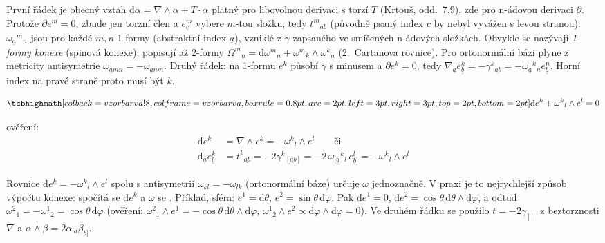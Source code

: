 \begin{vysvetleni}
První řádek je obecný vztah $\mathrm{d}\alpha=\nabla\wedge\alpha+T\cdot\alpha$ platný pro libovolnou derivaci s torzí $T$ (Krtouš, odd.~7.9), zde pro n-ádovou derivaci $\partial$. Protože $\partial e^m=0$, zbude jen torzní člen a $e^m_{\underline{c}}$ vybere $m$-tou složku, tedy $t^m{}_{\underline{ab}}$ (původně psaný index $c$ by nebyl vyvážen s levou stranou).
$\omega_{\underline{a}}{}^m{}_n$ jsou pro každé $m,n$ 1-formy (abstraktní index $\underline{a}$), vzniklé z $\gamma$ zapsaného ve smíšených n-ádových složkách. Obvykle se nazývají \emph{1-formy konexe} (spinová konexe);  popisují až 2-formy $\Omega^m{}_n=\mathrm{d}\omega^m{}_n+\omega^m{}_k\wedge\omega^k{}_n$ (2.~Cartanova rovnice). Pro ortonormální bázi plyne z metricity antisymetrie $\omega_{\underline{a}mn}=-\omega_{\underline{a}nm}$.
Druhý řádek: na 1-formu $e^k$ působí $\gamma$ s minusem a $\partial e^k=0$, tedy $\nabla_{\underline{a}}e^k_{\underline{b}}=-\gamma^k{}_{\underline{ab}}=-\omega_{\underline{a}}{}^k{}_n e^n_{\underline{b}}$. Horní index na pravé straně proto musí být $k$.
\end{vysvetleni}

\begin{veta}
\[ \vzorec{\mathrm{d}e^k + \omega^k{}_l\wedge e^l = 0} \]
\end{veta}
ověření:
\begin{align*}
  \mathrm{d}e^k &= \nabla\wedge e^k = -\omega^k{}_l\wedge e^l \qquad\text{či} \\
  \mathrm{d}_{\underline{a}}e^k_{\underline{b}} &= t^k{}_{\underline{ab}} = -2\gamma^k{}_{[\underline{ab}]} = -2\,\omega_{[\underline{a}}{}^k{}_l\,e^l_{\underline{b}]} = -\omega^k{}_l\wedge e^l
\end{align*}

\begin{vysvetleni}
Rovnice $\mathrm{d}e^k=-\omega^k{}_l\wedge e^l$ spolu s antisymetrií $\omega_{kl}=-\omega_{lk}$ (ortonormální báze) určuje $\omega$ jednoznačně. V praxi je to nejrychlejší způsob výpočtu konexe: spočítá se $\mathrm{d}e^k$ a $\omega$ se .
Příklad, sféra: $e^1=\mathrm{d}\theta$, $e^2=\sin\theta\,\mathrm{d}\varphi$. Pak $\mathrm{d}e^1=0$, $\mathrm{d}e^2=\cos\theta\,\mathrm{d}\theta\wedge\mathrm{d}\varphi$, a odtud $\omega^2{}_1=-\omega^1{}_2=\cos\theta\,\mathrm{d}\varphi$ (ověření: $\omega^2{}_1\wedge e^1=-\cos\theta\,\mathrm{d}\theta\wedge\mathrm{d}\varphi$, $\omega^1{}_2\wedge e^2\propto\mathrm{d}\varphi\wedge\mathrm{d}\varphi=0$).
Ve druhém řádku se použilo $t=-2\gamma_{[\,]}$ z beztorznosti $\nabla$ a $\alpha\wedge\beta=2\alpha_{[a}\beta_{b]}$.
\end{vysvetleni}

